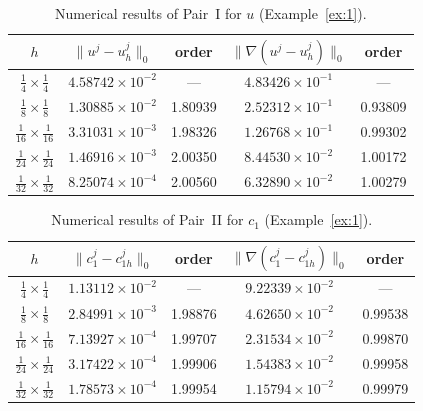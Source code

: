 \begin{table}[htbp]
\centering
\caption{Numerical results of Pair~I for $u$ (Example~\ref{ex:1}).}
\label{tab:PairI-u}
\begin{tabular}{ccccc}
\hline
$h$ &
$\|u^{j} - u_{h}^{j}\|_{0}$ & order &
$\|\nabla(u^{j} - u_{h}^{j})\|_{0}$ & order \\
\hline
$\tfrac{1}{4} \times \tfrac{1}{4}$   & $4.58742\times10^{-2}$ & ---     & $4.83426\times10^{-1}$ & ---     \\
$\tfrac{1}{8} \times \tfrac{1}{8}$   & $1.30885\times10^{-2}$ & 1.80939 & $2.52312\times10^{-1}$ & 0.93809 \\
$\tfrac{1}{16}\times \tfrac{1}{16}$  & $3.31031\times10^{-3}$ & 1.98326 & $1.26768\times10^{-1}$ & 0.99302 \\
$\tfrac{1}{24}\times \tfrac{1}{24}$  & $1.46916\times10^{-3}$ & 2.00350 & $8.44530\times10^{-2}$ & 1.00172 \\
$\tfrac{1}{32}\times \tfrac{1}{32}$  & $8.25074\times10^{-4}$ & 2.00560 & $6.32890\times10^{-2}$ & 1.00279 \\
\hline
\end{tabular}
\end{table}


\begin{table}[htbp]
\centering
\caption{Numerical results of Pair~II for $c_{1}$ (Example~\ref{ex:1}).}
\label{tab:PairII-c1}
\begin{tabular}{ccccc}
\hline
$h$ &
$\|c_{1}^{j} - c_{1h}^{j}\|_{0}$ & order &
$\|\nabla(c_{1}^{j} - c_{1h}^{j})\|_{0}$ & order \\
\hline
$\tfrac{1}{4} \times \tfrac{1}{4}$   & $1.13112\times10^{-2}$ & ---     & $9.22339\times10^{-2}$ & ---     \\
$\tfrac{1}{8} \times \tfrac{1}{8}$   & $2.84991\times10^{-3}$ & 1.98876 & $4.62650\times10^{-2}$ & 0.99538 \\
$\tfrac{1}{16}\times \tfrac{1}{16}$  & $7.13927\times10^{-4}$ & 1.99707 & $2.31534\times10^{-2}$ & 0.99870 \\
$\tfrac{1}{24}\times \tfrac{1}{24}$  & $3.17422\times10^{-4}$ & 1.99906 & $1.54383\times10^{-2}$ & 0.99958 \\
$\tfrac{1}{32}\times \tfrac{1}{32}$  & $1.78573\times10^{-4}$ & 1.99954 & $1.15794\times10^{-2}$ & 0.99979 \\
\hline
\end{tabular}
\end{table}

